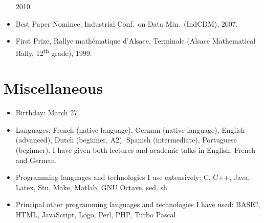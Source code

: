 \documentclass[line,mm]{res}
\newcounter{x}
\newcounter{y}
\begin{document}
\begin{resume}
\begin{itemize}
    2010.  
  \item 
    Best Paper Nominee, Industrial Conf.\ on Data Min.\ (IndCDM), 2007.    
  \item 
    First Prize, Rallye mathématique d'Alsace, Terminale (Alsace
    Mathematical Rally, 12\textsuperscript{th} grade), 1999. 
\end{itemize}

\section{Miscellaneous}
\begin{itemize}
  \item Birthday:  March 27
  \item Languages: 
    French (native language), 
    German (native language),
    English (advanced), 
    Dutch (beginner, A2), 
    Spanish (intermediate), 
    Portuguese (beginner).  
    I have given both lectures and academic talks in English, French and German. 
  \item Programming languages and technologies I use extensively:
    C, C++, Java, Latex, Stu, Make, Matlab, GNU Octave, sed, sh
  \item Principal other programming languages and technologies I have used:
    BASIC, HTML, JavaScript, Logo, Perl, PHP, Turbo Pascal 
\end{itemize}

\end{resume}
\end{document}
